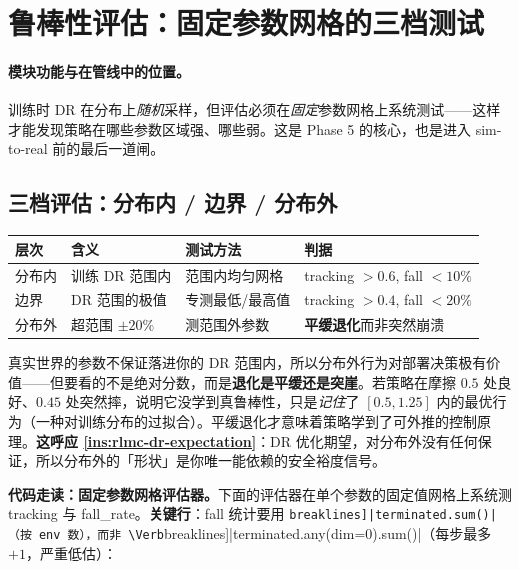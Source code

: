 \section{鲁棒性评估：固定参数网格的三档测试}
\label{sec:rlmc-dr-robust}

\paragraph{模块功能与在管线中的位置。}训练时 DR 在分布上\emph{随机}采样，但评估必须在\emph{固定}参数网格上系统测试——这样才能发现策略在哪些参数区域强、哪些弱。这是 Phase 5 的核心，也是进入 sim-to-real 前的最后一道闸。

\subsection{三档评估：分布内 / 边界 / 分布外}
\label{sec:rlmc-dr-robust-3level}

\begin{center}
\small
\begin{tabular}{@{}llll@{}}
\toprule
层次 & 含义 & 测试方法 & 判据 \\
\midrule
分布内 & 训练 DR 范围内 & 范围内均匀网格 & tracking $>0.6$, fall $<10\%$ \\
边界 & DR 范围的极值 & 专测最低/最高值 & tracking $>0.4$, fall $<20\%$ \\
分布外 & 超范围 $\pm 20\%$ & 测范围外参数 & \textbf{平缓退化}而非突然崩溃 \\
\bottomrule
\end{tabular}
\end{center}

\begin{insight}\label{ins:rlmc-dr-ood}
真实世界的参数不保证落进你的 DR 范围内，所以分布外行为对部署决策极有价值——但要看的不是绝对分数，而是\textbf{退化是平缓还是突崖}。若策略在摩擦 $0.5$ 处良好、$0.45$ 处突然摔，说明它没学到真鲁棒性，只是\emph{记住}了 $[0.5,1.25]$ 内的最优行为（一种对训练分布的过拟合）。平缓退化才意味着策略学到了可外推的控制原理。\textbf{这呼应 \cref{ins:rlmc-dr-expectation}}：DR 优化期望，对分布外没有任何保证，所以分布外的「形状」是你唯一能依赖的安全裕度信号。
\end{insight}

\textbf{代码走读：固定参数网格评估器。}下面的评估器在单个参数的固定值网格上系统测 tracking 与 fall\_rate。\textbf{关键行}：fall 统计要用 \Verb[breaklines]|terminated.sum()|（按 env 数），而非 \Verb[breaklines]|terminated.any(dim=0).sum()|（每步最多 $+1$，严重低估）：

